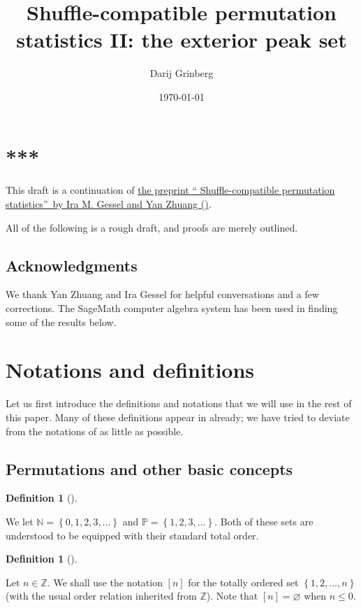\documentclass[numbers=enddot,12pt,final,onecolumn,notitlepage]{scrartcl}%
\theoremstyle{definition}
\newtheorem{defi}[theo]{Definition}
\newenvironment{definition}[1][]
{\begin{defi}[#1]\begin{leftbar}}
{\end{leftbar}\end{defi}}
\begin{document}
\title{Shuffle-compatible permutation statistics II: the exterior peak set}
\author{Darij Grinberg}
\date{\today}
\maketitle
\tableofcontents

\section*{***}

This draft is a continuation of
\href{http://lanl.arxiv.org/abs/1706.00750v1}{the preprint \textquotedblleft
Shuffle-compatible permutation statistics\textquotedblright\ by Ira M. Gessel
and Yan Zhuang (\cite{part1})}.

All of the following is a rough draft, and proofs are merely outlined.

\subsection*{Acknowledgments}

We thank Yan Zhuang and Ira Gessel for helpful conversations and a few
corrections. The SageMath computer algebra system \cite{SageMath} has been
used in finding some of the results below.

\section{Notations and definitions}

Let us first introduce the definitions and notations that we will use in the
rest of this paper. Many of these definitions appear in \cite{part1} already;
we have tried to deviate from the notations of \cite{part1} as little as possible.

\subsection{Permutations and other basic concepts}

\begin{definition}
We let $\mathbb{N}=\left\{  0,1,2,3,\ldots\right\}  $ and $\mathbb{P}=\left\{
1,2,3,\ldots\right\}  $. Both of these sets are understood to be equipped with
their standard total order.
\end{definition}

\begin{definition}
Let $n\in\mathbb{Z}$. We shall use the notation $\left[  n\right]  $ for the
totally ordered set $\left\{  1,2,\ldots,n\right\}  $ (with the usual order
relation inherited from $\mathbb{Z}$). Note that $\left[  n\right]
=\varnothing$ when $n\leq0$.
\end{definition}
\end{document}
